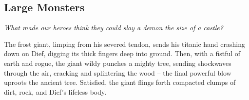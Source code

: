 \subsection{Large Monsters}
\textit{What made our heroes think they could slay a demon the size of a castle?}

\begin{quotebox}
The frost giant, limping from his severed tendon, sends his titanic hand crashing down on Dief, digging its thick fingers deep into ground. Then, with a fistful of earth and rogue, the giant wildy punches a mighty tree, sending shockwaves through the air, cracking and splintering the wood -- the final powerful blow uproots the ancient tree. Satisfied, the giant flings forth compacted clumps of dirt, rock, and Dief's lifeless body.
\end{quotebox}
